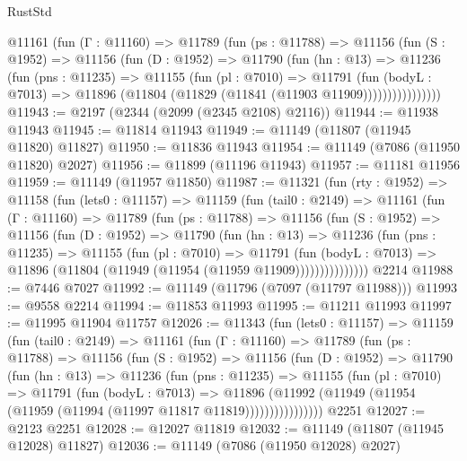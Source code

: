 \begin{lexlean}{RustStd}
\begin{coremodule}
          @11161
            (fun (Γ : @11160) =>
            @11789
              (fun (ps : @11788) =>
              @11156
                (fun (S : @1952) =>
                @11156
                  (fun (D : @1952) =>
                  @11790
                    (fun (hn : @13) =>
                    @11236
                      (fun (pns : @11235) =>
                      @11155
                        (fun (pl : @7010) =>
                        @11791
                          (fun (bodyL : @7013) =>
                          @11896 (@11804 (@11829 (@11841 (@11903 @11909))))))))))))))))
@11943 := @2197 (@2344 (@2099 (@2345 @2108) @2116))
@11944 := @11938 @11943
@11945 := @11814 @11943
@11949 := @11149 (@11807 (@11945 @11820) @11827)
@11950 := @11836 @11943
@11954 := @11149 (@7086 (@11950 @11820) @2027)
@11956 := @11899 (@11196 @11943)
@11957 := @11181 @11956
@11959 := @11149 (@11957 @11850)
@11987 := @11321
    (fun (rty : @1952) =>
    @11158
      (fun (lets0 : @11157) =>
      @11159
        (fun (tail0 : @2149) =>
        @11161
          (fun (Γ : @11160) =>
          @11789
            (fun (ps : @11788) =>
            @11156
              (fun (S : @1952) =>
              @11156
                (fun (D : @1952) =>
                @11790
                  (fun (hn : @13) =>
                  @11236
                    (fun (pns : @11235) =>
                    @11155
                      (fun (pl : @7010) =>
                      @11791
                        (fun (bodyL : @7013) =>
                        @11896 (@11804 (@11949 (@11954 (@11959 @11909)))))))))))))))
    @2214
@11988 := @7446 @7027
@11992 := @11149 (@11796 (@7097 (@11797 @11988)))
@11993 := @9558 @2214
@11994 := @11853 @11993
@11995 := @11211 @11993
@11997 := @11995 @11904 @11757
@12026 := @11343
    (fun (lets0 : @11157) =>
    @11159
      (fun (tail0 : @2149) =>
      @11161
        (fun (Γ : @11160) =>
        @11789
          (fun (ps : @11788) =>
          @11156
            (fun (S : @1952) =>
            @11156
              (fun (D : @1952) =>
              @11790
                (fun (hn : @13) =>
                @11236
                  (fun (pns : @11235) =>
                  @11155
                    (fun (pl : @7010) =>
                    @11791
                      (fun (bodyL : @7013) =>
                      @11896
                        (@11992
                          (@11949 (@11954 (@11959 (@11994 (@11997 @11817 @11819))))))))))))))))
    @2251
@12027 := @2123 @2251
@12028 := @12027 @11819
@12032 := @11149 (@11807 (@11945 @12028) @11827)
@12036 := @11149 (@7086 (@11950 @12028) @2027)

\end{coremodule}
\end{lexlean}
